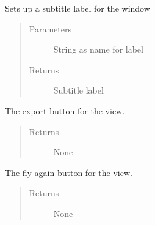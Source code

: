 \documentclass[letterpaper,10pt,english]{sphinxmanual}
\begin{document}
\begin{fulllineitems}
\begin{fulllineitems}
\label{\detokenize{index:src.Views.View_ReportScreen.ReportWindow.setSubTitle}}
Sets up a subtitle label for the window
\begin{quote}\begin{description}
\item[{Parameters}] \leavevmode
{} \textendash{} String as name for label

\item[{Returns}] \leavevmode
Subtitle label

\end{description}\end{quote}

\end{fulllineitems}


\begin{fulllineitems}
\label{\detokenize{index:src.Views.View_ReportScreen.ReportWindow.set_BtnExport}}
The export button for the view.
\begin{quote}\begin{description}
\item[{Returns}] \leavevmode
None

\end{description}\end{quote}

\end{fulllineitems}


\begin{fulllineitems}
\label{\detokenize{index:src.Views.View_ReportScreen.ReportWindow.set_BtnFlyAgain}}
The fly again button for the view.
\begin{quote}\begin{description}
\item[{Returns}] \leavevmode
None


\end{description}
\end{quote}
\end{fulllineitems}
\end{fulllineitems}
\end{document}
